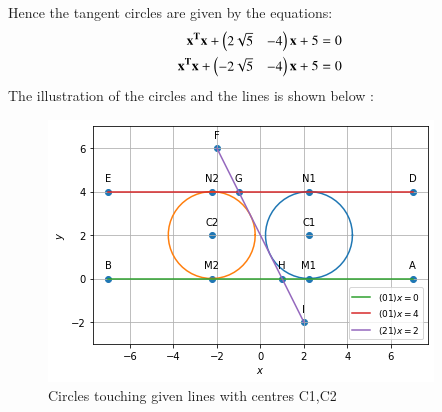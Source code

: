 \documentclass[journal,12pt,twocolumn]{IEEEtran}
\begin{document}
Hence the tangent circles are given by the equations:
\begin{align}
\mathbf{x^T}\mathbf{x} + \begin{pmatrix}2\sqrt{5} & -4\end{pmatrix}\mathbf{x} + 5 &= 0 \\
\mathbf{x^T}\mathbf{x} + \begin{pmatrix}-2\sqrt{5} & -4\end{pmatrix}\mathbf{x} + 5 &= 0
\end{align}
The illustration of the circles and the lines is shown below :
\begin{figure}[!ht]
       \centering
    \includegraphics[width=\columnwidth] {Assignment_3_Fig_1.png}
    \caption{Circles touching given lines with centres C1,C2}
    \label{Tangent circles to 3 given lines}
\end{figure}
\end{document}
